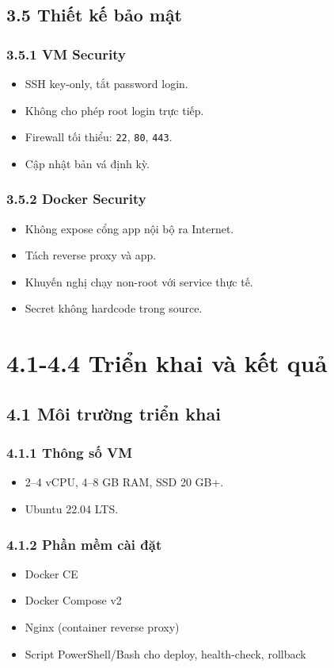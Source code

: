 \subsection*{3.5 Thiết kế bảo mật}
\subsubsection*{3.5.1 VM Security}
\begin{itemize}
  \item SSH key-only, tắt password login.
  \item Không cho phép root login trực tiếp.
  \item Firewall tối thiểu: \texttt{22}, \texttt{80}, \texttt{443}.
  \item Cập nhật bản vá định kỳ.
\end{itemize}

\subsubsection*{3.5.2 Docker Security}
\begin{itemize}
  \item Không expose cổng app nội bộ ra Internet.
  \item Tách reverse proxy và app.
  \item Khuyến nghị chạy non-root với service thực tế.
  \item Secret không hardcode trong source.
\end{itemize}

\section*{4.1-4.4 Triển khai và kết quả}

\subsection*{4.1 Môi trường triển khai}
\subsubsection*{4.1.1 Thông số VM}
\begin{itemize}
  \item 2--4 vCPU, 4--8 GB RAM, SSD 20 GB+.
  \item Ubuntu 22.04 LTS.
\end{itemize}

\subsubsection*{4.1.2 Phần mềm cài đặt}
\begin{itemize}
  \item Docker CE
  \item Docker Compose v2
  \item Nginx (container reverse proxy)
  \item Script PowerShell/Bash cho deploy, health-check, rollback
\end{itemize}

